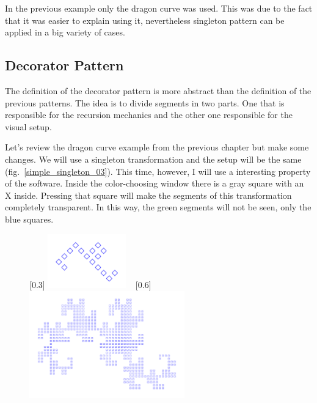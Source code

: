         \FloatBarrier

        In the previous example only the dragon curve was used.
        This was due to the fact that it was easier to explain using it, nevertheless singleton pattern can be applied in a big variety of cases.
        

    \subsection{Decorator Pattern}

        The definition of the decorator pattern is more abstract than the definition of the previous patterns.
        The idea is to divide segments in two parts. 
        One that is responsible for the recursion mechanics and the other one responsible for the visual setup.

        Let's review the dragon curve example from the previous chapter but make some changes.
        We will use a singleton transformation and the setup will be the same (fig.~\ref{simple_singleton_03}).
        This time, however, I will use a interesting property of the software.
        Inside the color-choosing window there is a gray square with an X inside.
        Pressing that square will make the segments of this transformation completely transparent.
        In this way, the green segments will not be seen, only the blue squares.

        \begin{figure}[ht]
            \centering
            \subcaptionbox{}[0.3\textwidth]
                {\includegraphics[width=0.3\textwidth]{img/Simple_Techniques/Decorator/simple_deco_01.png}}
            ~
            \subcaptionbox{}[0.6\textwidth]
                {\includegraphics[width=0.6\textwidth]{img/Simple_Techniques/Decorator/simple_deco_02.png}}
        \end{figure}

